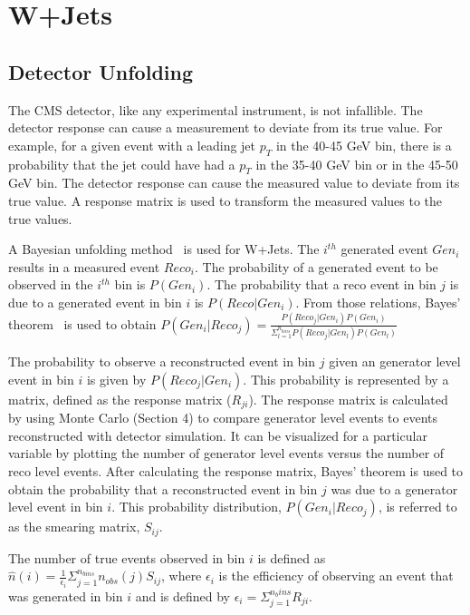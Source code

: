 \section{W+Jets}
\subsection{Detector Unfolding}
\qquad The CMS detector, like any experimental instrument, is not infallible. The detector response can cause a measurement to deviate from its true value. For example, for a given event with a leading jet $p_{T}$ in the 40-45 GeV bin, there is a probability that the jet could have had a $p_{T}$ in the 35-40 GeV bin or in the 45-50 GeV bin. The detector response can cause the measured value to deviate from its true value. A response matrix is used to transform the measured values to the true values. 

\qquad A Bayesian unfolding method~\cite{D'Agostini199548} is used for W+Jets. The $i^{th}$ generated event $Gen_{i}$ results in a measured event $Reco_{i}$. The probability of a generated event to be observed in the $i^{th}$ bin is $P(Gen_{i})$. The probability that a reco event in bin $j$ is due to a generated event in bin $i$ is $P(Reco|Gen_{i})$. From those relations, Bayes' theorem~\cite{BevingtonRobinson200207} is used to obtain $P(Gen_{i}|Reco_{j}) = \frac{P(Reco_{j}|Gen_{i})P(Gen_{i})}{\Sigma_{l=1}^{n_{bins}}P(Reco_{j}|Gen_{l})P(Gen_{l})}$

\qquad The probability to observe a reconstructed event in bin $j$ given an generator level event in bin $i$ is given by $P(Reco_{j}|Gen_{i})$. This probability is represented by a matrix, defined as the response matrix ($R_{ji}$). The response matrix is calculated by using Monte Carlo (Section 4) to compare generator level events to events reconstructed with detector simulation. It can be visualized for a particular variable by plotting the number of generator level events versus the number of reco level events. After calculating the response matrix, Bayes' theorem is used to obtain the probability that a reconstructed event in bin $j$ was due to a generator level event in bin $i$. This probability distribution, $P(Gen_{i}|Reco_{j})$, is referred to as the smearing matrix, $S_{ij}$.

\qquad The number of true events observed in bin $i$ is defined as $\hat{n}(i) = \frac{1}{\epsilon_{i}}\Sigma_{j=1}^{n_{bins}}n_{obs}(j)S_{ij}$, where $\epsilon_{i}$ is the efficiency of observing an event that was generated in bin $i$ and is defined by $\epsilon_{i}=\Sigma_{j=1}^{n_bins}R_{ji}$.

